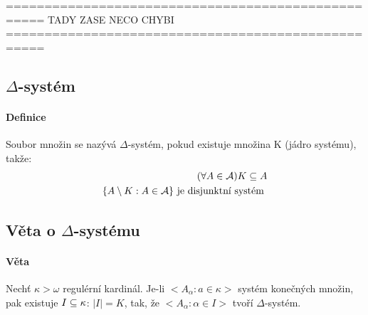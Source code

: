 \documentclass[a4paper,12pt,titlepage]{article}
\begin{document}
\begin{enumerate}
===================================================
TADY ZASE NECO CHYBI
===================================================

\subsection{$\Delta$-systém}
\setcounter{equation}{0}
\paragraph{Definice}
Soubor  množin se nazývá $\Delta$-systém, pokud existuje množina K (jádro
systému), takže:
\begin{align}
	(\forall A \in \mathcal{A}) K \subseteq A \\
	\{ A \setminus K : A \in \mathcal{A} \} \text{ je disjunktní systém }
\end{align}
\subsection{Věta o $\Delta$-systému}
\setcounter{equation}{0}
\paragraph{Věta}
Nechť $\kappa > \omega$ regulérní kardinál. Je-li $< A_\alpha : a \in \kappa>$
systém konečných množin, pak existuje $I \subseteq \kappa$:
$|I| = K$,  tak, že  $<A_\alpha : \alpha \in I>$ tvoří $\Delta$-systém.

\end{enumerate}
\end{document}
